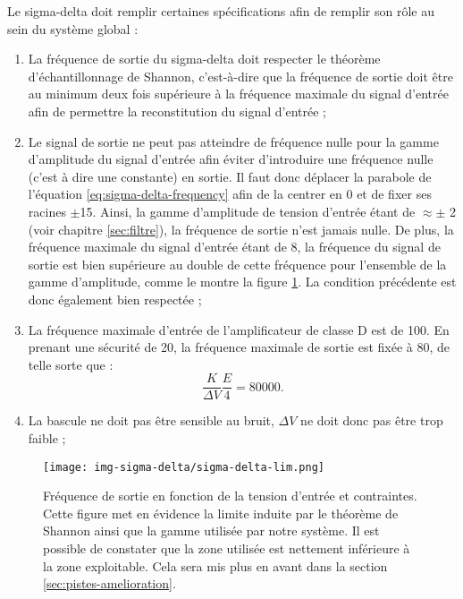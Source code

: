 Le sigma-delta doit remplir certaines spécifications afin de remplir son rôle au sein du système global : 
\begin{enumerate}	
	\item La fréquence de sortie du sigma-delta doit respecter le théorème d’échantillonnage de Shannon, c'est-à-dire
	que la fréquence de sortie doit être au minimum deux fois supérieure à la fréquence maximale du signal d'entrée
	afin de permettre la reconstitution du signal d'entrée ;
	\item Le signal de sortie ne peut pas atteindre de fréquence nulle pour la gamme d'amplitude du signal
	d'entrée afin éviter d'introduire une fréquence nulle (c'est à dire une constante) en sortie. Il faut donc
	déplacer la parabole de l'équation \ref{eq:sigma-delta-frequency} afin de la centrer en $0$ et de fixer
	ses racines $\pm$\unit{15}{\volt}. Ainsi, la gamme d'amplitude de tension d'entrée étant de $\approx \pm$ \unit{2}{\volt}
	(voir chapitre \ref{sec:filtre}), la fréquence de sortie n'est jamais nulle. De plus, la fréquence maximale du signal 
	d'entrée étant de \unit{8}{\kilo\hertz}, la fréquence du signal de sortie est bien supérieure au double de cette 
	fréquence pour l'ensemble de la gamme d'amplitude, comme le montre la figure \ref{fig:sigma-delta-lim}.
	La condition précédente est donc également bien respectée ;
	\item La fréquence maximale d'entrée de l'amplificateur de classe D est de \unit{100}{\kilo\hertz}.
	En prenant une sécurité de \unit{20}{\kilo\hertz}, la fréquence maximale de sortie est fixée à \unit{80}{\kilo\hertz},
	de telle sorte que :
	\begin{equation} 
		\frac{K}{\Delta V}\frac{E}{4} = 80000.
		\label{eq:sd-f-max}
	\end{equation}
	\item La bascule ne doit pas être sensible au bruit, $\Delta V$ ne doit donc pas être trop faible ;
\end{enumerate}
 
\begin{figure}[ht]
	\centering
	\texttt{[image: img-sigma-delta/sigma-delta-lim.png]}
	\caption{Fréquence de sortie en fonction de la tension d'entrée et contraintes. Cette figure
	met en évidence la limite induite par le théorème de Shannon ainsi que la gamme utilisée par notre système.
	Il est possible de constater que la zone utilisée est nettement inférieure à la zone exploitable. 
	Cela sera mis plus en avant dans la section \ref{sec:pistes-amelioration}.}
	\label{fig:sigma-delta-lim}
\end{figure}


